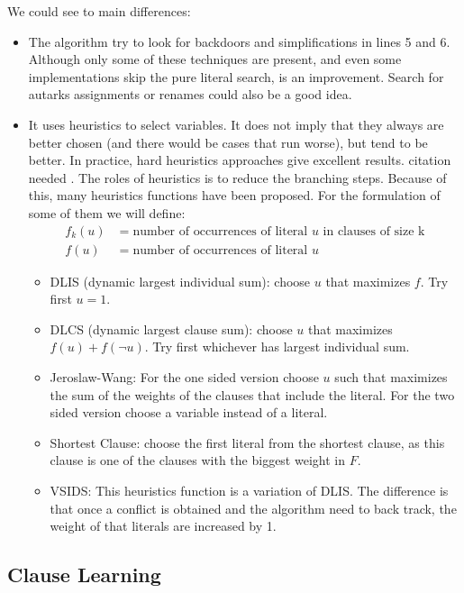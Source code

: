 We could see to main differences:
\begin{itemize}
\item The algorithm try to look for backdoors and simplifications in lines 5 and 6. Although only some of these techniques are present, and even some implementations skip the pure  literal search, is an improvement. Search for autarks assignments or renames could also be a good idea.

\item It uses heuristics to select variables. It does not imply that they always are better chosen  (and there would be cases that run worse), but tend to be better. In practice, hard heuristics approaches give excellent results. {\color{red} citation needed }. The roles of heuristics is to reduce the branching steps. Because of this, many heuristics functions have been proposed. For the formulation of some of them we will define:
  \begin{equation}
    \begin{split}
      f_k(u) & = \text{number of occurrences of literal } u \text{ in clauses of size k}\\
      f(u) & = \text{number of occurrences of literal } u
\end{split}
\end{equation}
  
  \begin{itemize}
  \item DLIS (dynamic largest individual sum): choose $u$ that maximizes $f$. Try first $u=1$.
  \item DLCS (dynamic largest clause sum):  choose $u$ that maximizes $f(u)+f(\neg u)$. Try first whichever has largest individual sum.
  \item Jeroslaw-Wang: For the one sided version choose $u$ such that maximizes the sum of the weights of the clauses that include the literal. For the two sided version choose a variable instead of a literal.
  \item Shortest Clause: choose the first literal from the shortest clause, as this clause is one of the clauses with the biggest weight in $F$.
  \item VSIDS: This heuristics function is a variation of DLIS. The difference is that once a conflict is obtained and the algorithm need to back track, the weight of that literals are increased by 1.
  \end{itemize}
\end{itemize}

\subsection{Clause Learning}

